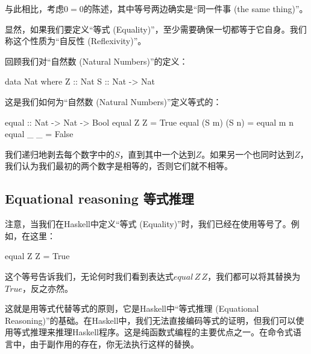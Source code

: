\documentclass[DaoFP]{subfiles}
\begin{document}
 与此相比，考虑$0 = 0$的陈述，其中等号两边确实是“同一件事 (the same thing)”。

 显然，如果我们要定义“等式 (Equality)”，至少需要确保一切都等于它自身。我们称这个性质为“自反性 (Reflexivity)”。

 回顾我们对“自然数 (Natural Numbers)”的定义：
 \begin{haskell}
  data Nat where
  Z :: Nat
  S :: Nat -> Nat
 \end{haskell}

 这是我们如何为“自然数 (Natural Numbers)”定义等式的：
 \begin{haskell}
  equal :: Nat -> Nat -> Bool
  equal Z Z = True
  equal (S m) (S n) = equal m n
  equal _ _ = False
 \end{haskell}

 我们递归地剥去每个数字中的$S$，直到其中一个达到$Z$。如果另一个也同时达到$Z$，我们认为我们最初的两个数字是相等的，否则它们就不相等。

 \subsection{Equational reasoning 等式推理}

 注意，当我们在Haskell中定义“等式 (Equality)”时，我们已经在使用等号了。例如，在这里：
 \begin{haskell}
  equal Z Z = True
 \end{haskell}
 这个等号告诉我们，无论何时我们看到表达式$equal\,Z\,Z$，我们都可以将其替换为$True$，反之亦然。

 这就是用等式代替等式的原则，它是Haskell中“等式推理 (Equational Reasoning)”的基础。在Haskell中，我们无法直接编码等式的证明，但我们可以使用等式推理来推理Haskell程序。这是纯函数式编程的主要优点之一。在命令式语言中，由于副作用的存在，你无法执行这样的替换。
\end{document}
